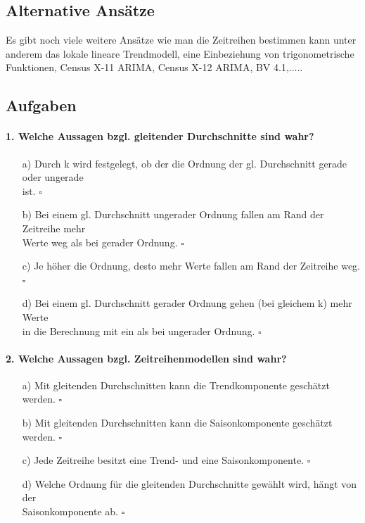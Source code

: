 \documentclass[a4paper]{article}
\begin{document}
\subsection{Alternative Ansätze}
Es gibt noch viele weitere Ansätze wie man die Zeitreihen bestimmen kann unter anderem das lokale lineare Trendmodell, eine Einbeziehung von trigonometrische Funktionen, Census X-11 ARIMA, Census X-12 ARIMA, BV 4.1,.....








\clearpage

\subsection{Aufgaben}

\paragraph{1. Welche Aussagen bzgl. gleitender Durchschnitte sind wahr?}

\begin{itemize}
    \item[a)] Durch k wird festgelegt, ob der die Ordnung der gl. Durchschnitt gerade oder ungerade\\ist. \hfill $\square$
    \item[b)] Bei einem gl. Durchschnitt ungerader Ordnung fallen am Rand der Zeitreihe mehr\\Werte weg als bei gerader Ordnung. \hfill $\square$
    \item[c)] Je höher die Ordnung, desto mehr Werte fallen am Rand der Zeitreihe weg. \hfill $\square$
    \item[d)] Bei einem gl. Durchschnitt gerader Ordnung gehen (bei gleichem k) mehr Werte\\in die Berechnung mit ein als bei ungerader Ordnung. \hfill $\square$
\end{itemize}

\paragraph{2. Welche Aussagen bzgl. Zeitreihenmodellen sind wahr?}

\begin{itemize}
    \item[a)] Mit gleitenden Durchschnitten kann die Trendkomponente geschätzt werden. \hfill $\square$
    \item[b)] Mit gleitenden Durchschnitten kann die Saisonkomponente geschätzt werden. \hfill $\square$
    \item[c)] Jede Zeitreihe besitzt eine Trend- und eine Saisonkomponente. \hfill $\square$
    \item[d)] Welche Ordnung für die gleitenden Durchschnitte gewählt wird, hängt von der\\Saisonkomponente ab. \hfill $\square$
\end{itemize}
\end{document}
